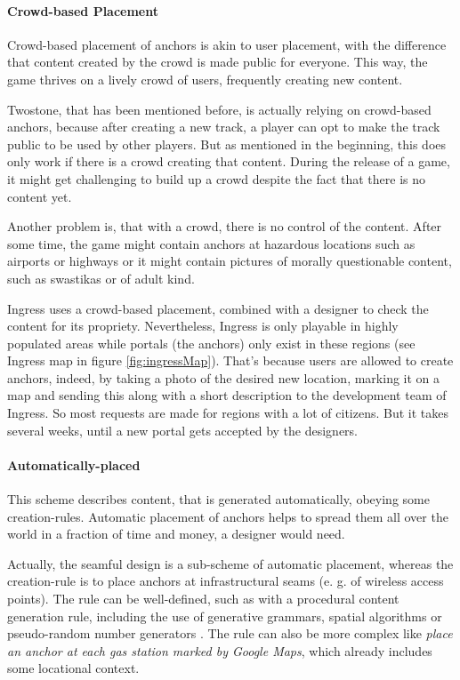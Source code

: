 \paragraph{Crowd-based Placement}
Crowd-based placement of anchors is akin to user placement, with the difference that content created by the crowd is made public for everyone. This way, the game thrives on a lively crowd of users, frequently creating new content.

Twostone, that has been mentioned before, is actually relying on crowd-based anchors, because after creating a new track, a player can opt to make the track public to be used by other players. But as mentioned in the beginning, this does only work if there is a crowd creating that content. During the release of a game, it might get challenging to build up a crowd despite the fact that there is no content yet.

Another problem is, that with a crowd, there is no control of the content. After some time, the game might contain anchors at hazardous locations such as airports or highways or it might contain pictures of morally questionable content, such as swastikas or of adult kind.

Ingress uses a crowd-based placement, combined with a designer to check the content for its propriety. Nevertheless, Ingress is only playable in highly populated areas while portals (the anchors) only exist in these regions (see Ingress map in figure \ref{fig:ingressMap}). That's because users are allowed to create anchors, indeed, by taking a photo of the desired new location, marking it on a map and sending this along with a short description to the development team of Ingress. So most requests are made for regions with a lot of citizens. But it takes several weeks, until a new portal gets accepted by the designers.

\paragraph{Automatically-placed}
This scheme describes content, that is generated automatically, obeying some creation-rules. Automatic placement of anchors helps to spread them all over the world in a fraction of time and money, a designer would need.

Actually, the seamful design is a sub-scheme of automatic placement, whereas the creation-rule is to place anchors at infrastructural seams (e. g. of wireless access points).
The rule can be well-defined, such as with a procedural content generation rule, including the use of generative grammars, spatial algorithms or pseudo-random number generators \citep{carraca2014procedural}.
The rule can also be more complex like \emph{place an anchor at each gas station marked by Google Maps}, which already includes some locational context.

